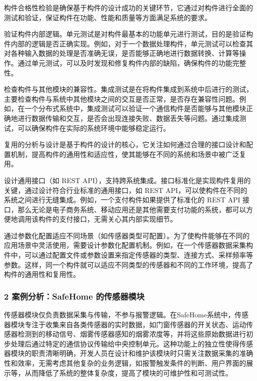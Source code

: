
构件合格性检验是确保基于构件的设计成功的关键环节，它通过对构件进行全面的测试和验证，保证构件在功能、性能和质量等方面满足系统的要求。


验证构件内部逻辑。单元测试是对构件最基本的功能单元进行测试，目的是验证构件内部的逻辑是否正确实现。例如，对于一个数据处理构件，单元测试可以检查其对各种输入数据的处理是否准确无误，是否能够正确地进行数据转换、计算等操作。通过单元测试，可以及时发现和修复构件内部的缺陷，确保构件的功能完整性。

检查构件与其他模块的兼容性。集成测试是在将构件集成到系统中后进行的测试，主要检查构件与系统中其他模块之间的交互是否正常，是否存在兼容性问题。例如，在一个分布式系统中，集成测试可以验证一个通信构件是否能够与其他模块正确地进行数据传输和交互，是否会出现连接失败、数据丢失等问题。通过集成测试，可以确保构件在实际的系统环境中能够稳定运行。


复用的分析与设计是基于构件的设计的核心，它关注如何通过合理的接口设计和配置机制，提高构件的通用性和适应性，使其能够在不同的系统和场景中被广泛复用。

设计通用接口（如 REST API），支持跨系统集成。接口标准化是实现构件复用的关键，通过设计符合行业标准的通用接口，如 REST API，可以使构件在不同的系统之间进行无缝集成。例如，一个支付构件如果提供了标准化的 REST API 接口，那么无论是电子商务系统、移动应用还是其他需要支付功能的系统，都可以方便地调用该构件的支付接口，无需关心其内部实现细节。

通过参数化配置适应不同场景（如传感器类型可配置）。为了使构件能够在不同的应用场景中灵活使用，需要设计参数化配置机制。例如，在一个传感器数据采集构件中，可以通过配置文件或参数设置来指定传感器的类型、连接方式、采样频率等参数。这样，同一个构件就可以适应不同类型的传感器和不同的工作环境，提高了构件的通用性和复用性。

\hypertarget{ux6848ux4f8bux5206ux6790safehome-ux7684ux4f20ux611fux5668ux6a21ux5757}{%
\subsubsection{2 案例分析：SafeHome 的传感器模块}\label{ux6848ux4f8bux5206ux6790safehome-ux7684ux4f20ux611fux5668ux6a21ux5757}}


传感器模块仅负责数据采集与传输，不参与报警逻辑。在SafeHome系统中，传感器模块专注于收集来自各类传感器的实时数据，如门窗传感器的开关状态、运动传感器检测到的移动信号、烟雾传感器感知的烟雾浓度等，并将这些原始数据进行初步处理后通过特定的通信协议传输给中央控制单元。这种功能上的独立性使得传感器模块的职责清晰明确，开发人员在设计和维护该模块时只需关注数据采集的准确性和效率，无需考虑其他复杂的业务逻辑，如报警触发条件的判断、用户界面的展示等，从而降低了系统的整体复杂度，提高了模块的可维护性和可测试性。

